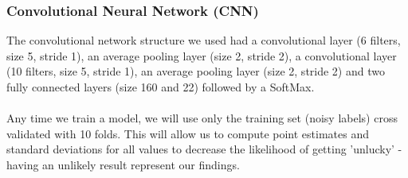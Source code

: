 \documentclass{article} %
\begin{document}
\subsubsection{\textbf Convolutional \textbf Neural \textbf Network (CNN)}
The convolutional network structure we used had 
a convolutional layer (6 filters, size 5, stride 1), an average pooling layer (size 2, stride 2), a convolutional layer (10 filters, size 5, stride 1), an average pooling layer (size 2, stride 2) and two fully connected layers (size 160 and 22) followed by a SoftMax.
\\\\
Any time we train a model, we will use only the training set (noisy labels) cross validated with 10 folds. This will allow us to compute point estimates and standard deviations for all values to decrease the likelihood of getting 'unlucky' - having an unlikely result represent our findings.
\end{document}
